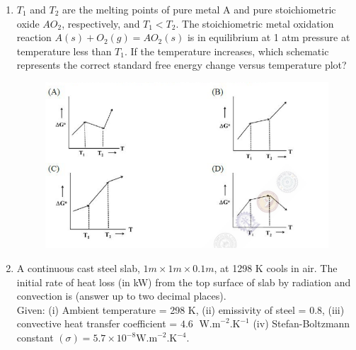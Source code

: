 \documentclass[journal]{IEEEtran}
\theoremstyle{remark}
\begin{document}
\begin{enumerate}
\item $T_1$ and $T_2$ are the melting points of pure metal A and pure stoichiometric oxide $AO_2$, respectively, and $T_1 < T_2$. The stoichiometric metal oxidation reaction $A(s)+O_2(g)=AO_2(s)$ is in equilibrium at 1 atm pressure at temperature less than $T_1$. If the temperature increases, which schematic represents the correct standard free energy change versus temperature plot? \hfill{}
\begin{figure}[H]
    \centering
    \includegraphics[width=0.8\columnwidth]{figs/Q.31.png}
    \caption{}
    \label{fig:placeholder}
\end{figure}
\item A continuous cast steel slab, $1m \times 1m \times 0.1m$, at 1298 K cools in air. The initial rate of heat loss (in kW) from the top surface of slab by radiation and convection is \underline {\hspace{2cm}} (answer up to two decimal places).\\
Given: (i) Ambient temperature = 298 K, (ii) emissivity of steel = 0.8, (iii) convective heat transfer coefficient = $4.6 \;\text{ W.m}^{-2}\text{.K}^{-1}$ (iv) Stefan-Boltzmann constant $(\sigma) = 5.7 \times 10^{-8} \text{W.m}^{-2}\text{.K}^{-4}$. \hfill{}


\end{enumerate}
\end{document}
